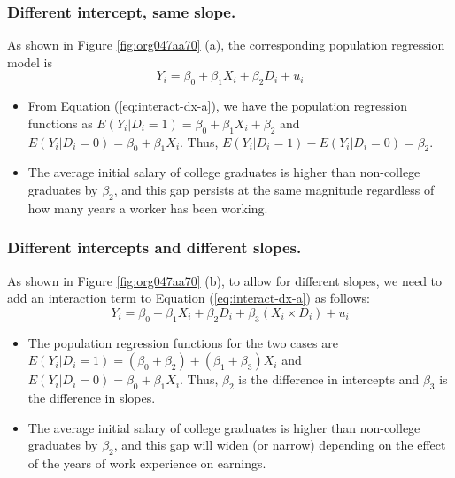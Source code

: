 \documentclass[a4paper,11pt]{article}
\begin{document}
\subsubsection*{Different intercept, same slope.}
\label{sec:orgd82e7c1}
As shown in Figure \ref{fig:org047aa70} (a), the corresponding population
regression model is
\begin{equation}
\label{eq:interact-dx-a}
Y_i = \beta_0 + \beta_1 X_i + \beta_2 D_i + u_i
\end{equation}

\begin{itemize}
\item From Equation (\ref{eq:interact-dx-a}), we have the population
regression functions as \(E(Y_i | D_i = 1) =
  \beta_0 + \beta_1 X_i + \beta_2\) and \(E(Y_i | D_i
  = 0) = \beta_0 + \beta_1 X_i\). Thus, \(E(Y_i | D_i = 1) - E(Y_i | D_i
  = 0) = \beta_2\).
\item The average initial salary of college graduates is higher than
non-college graduates by \(\beta_2\), and this gap persists at the same
magnitude regardless of how many years a worker has been working.
\end{itemize}

\subsubsection*{Different intercepts and different slopes.}
\label{sec:org37abe3a}
As shown in Figure \ref{fig:org047aa70} (b), to allow for different slopes, we
need to add an interaction term to Equation (\ref{eq:interact-dx-a})
as follows:
\begin{equation}
\label{eq:interact-dx-b}
Y_i = \beta_0 + \beta_1 X_i + \beta_2 D_i + \beta_3 (X_i \times D_i) + u_i
\end{equation}

\begin{itemize}
\item The population regression functions for the two cases are
\(E(Y_i|D_i=1) = (\beta_0+\beta_2) + (\beta_1 + \beta_3) X_i\) and
\(E(Y_i|D_i=0) = \beta_0 + \beta_1 X_i\). Thus, \(\beta_2\) is the
difference in intercepts and \(\beta_3\) is the difference in slopes.
\item The average initial salary of college graduates is higher than
non-college graduates by \(\beta_2\), and this gap will widen (or
narrow) depending on the effect of the years of work experience on
earnings.
\end{itemize}
\end{document}
